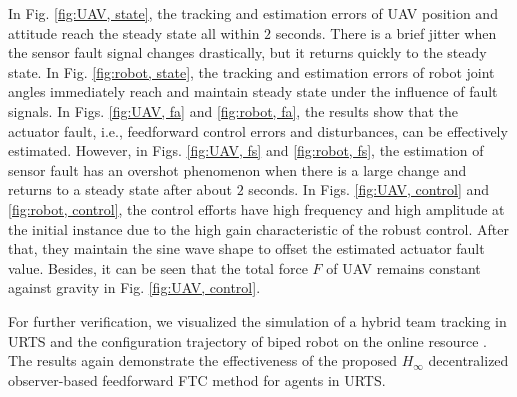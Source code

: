 \documentclass{ieeeaccess}
\begin{document}
In Fig. \ref{fig:UAV, state}, the tracking and estimation errors of UAV position and attitude reach the steady state all within $2$ seconds. There is a brief jitter when the sensor fault signal changes drastically, but it returns quickly to the steady state. In Fig. \ref{fig:robot, state}, the tracking and estimation errors of robot joint angles immediately reach and maintain steady state under the influence of fault signals. In Figs. \ref{fig:UAV, fa} and \ref{fig:robot, fa}, the results show that the actuator fault, i.e., feedforward control errors and disturbances, can be effectively estimated. However, in Figs. \ref{fig:UAV, fs} and \ref{fig:robot, fs}, the estimation of sensor fault has an overshot phenomenon when there is a large change and returns to a steady state after about $2$ seconds. In Figs. \ref{fig:UAV, control} and \ref{fig:robot, control}, the control efforts have high frequency and high amplitude at the initial instance due to the high gain characteristic of the robust control. After that, they maintain the sine wave shape to offset the estimated actuator fault value. Besides, it can be seen that the total force $F$ of UAV remains constant against gravity in Fig. \ref{fig:UAV, control}.

For further verification, we visualized the simulation of a hybrid team tracking in URTS and the configuration trajectory of biped robot on the online resource \cite{mySimulation}. The results again demonstrate the effectiveness of the proposed $H_\infty$ decentralized observer-based feedforward FTC method for agents in URTS.
\end{document}
